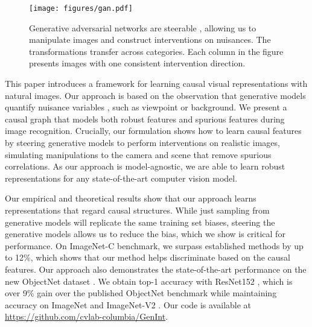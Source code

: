 \documentclass[final]{cvpr}
\begin{document}
\begin{figure*}[t]
  \centering
\vspace{-4mm}
  \texttt{[image: figures/gan.pdf]}
  \caption{Generative adversarial networks are steerable \cite{hrknen2020ganspace, jahanian2019steerability}, allowing us to manipulate images and construct interventions on nuisances. The transformations transfer across categories. Each column in the figure presents images with one consistent intervention direction.\vspace{-5mm}}
\label{fig:equi}
\end{figure*}

This paper introduces a framework for learning causal visual representations with natural images.
Our approach is based on the observation that generative models quantify nuisance variables \cite{hrknen2020ganspace, jahanian2019steerability}, such as viewpoint or background. We present a causal graph that models both robust features and spurious features during image recognition. Crucially, our formulation shows how to learn causal features by steering generative models to perform interventions on realistic images, simulating manipulations to the camera and scene that remove spurious correlations. 
As our approach is model-agnostic, we are able to learn robust representations for any state-of-the-art computer vision model. 










Our empirical and theoretical results show that our approach learns representations that regard causal structures.
While just sampling from generative models will replicate the same training set biases, steering the generative models allows us to reduce the bias, which we show is critical for performance. On ImageNet-C \cite{imgnet-C} benchmark, we surpass established methods by up to 12\%, which shows that our method helps discriminate based on the causal features. 
Our approach also demonstrates the state-of-the-art performance on the new ObjectNet dataset \cite{Objectnet}. We obtain  top-1 accuracy with ResNet152 \cite{He_2016}, which is over 9\% gain over the published ObjectNet benchmark \cite{Objectnet} while maintaining accuracy on ImageNet and ImageNet-V2 \cite{ImageNetOverfit}. Our code is available at \url{https://github.com/cvlab-columbia/GenInt}. 
\end{document}
